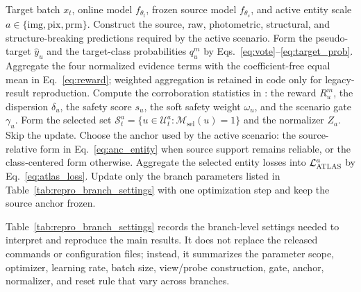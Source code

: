 \begin{algorithm}[t]
\caption{One online \textsc{ATLAS} update on a target batch}
\label{alg:atlas_update}
\small
\begin{algorithmic}[1]
\Require Target batch $x_t$, online model $f_{\theta_t}$, frozen source model $f_{\theta_s}$, and active entity scale $a\in\{\mathrm{img},\mathrm{pix},\mathrm{prm}\}$.
\State Construct the source, raw, photometric, structural, and structure-breaking predictions required by the active scenario.
\State Form the pseudo-target $\hat y_u$ and the target-class probabilities $q_u^m$ by Eqs.~\ref{eq:vote}--\ref{eq:target_prob}.
\State Aggregate the four normalized evidence terms with the coefficient-free equal mean in Eq.~\ref{eq:reward}; weighted aggregation is retained in code only for legacy-result reproduction.
\State Compute the corroboration statistics in \core{}: the reward $R_u^m$, the dispersion $\delta_u$, the safety score $s_u$, the soft safety weight $\omega_u$, and the scenario gate $\gamma_u$.
\State Form the selected set $\mathcal{S}_t^a=\{u\in\mathcal{U}_t^a:\mathcal{M}_{\mathrm{sel}}(u)=1\}$ and the normalizer $Z_a$.
    \State Skip the update.
\EndIf
{}
    \State Choose the \care{} anchor used by the active scenario: the source-relative form in Eq.~\ref{eq:anc_entity} when source support remains reliable, or the class-centered form otherwise.
\EndFor
\State Aggregate the selected entity losses into $\mathcal{L}_{\text{\textsc{ATLAS}}}^{a}$ by Eq.~\ref{eq:atlas_loss}.
\State Update only the branch parameters listed in Table~\ref{tab:repro_branch_settings} with one optimization step and keep the source anchor frozen.
\end{algorithmic}
\end{algorithm}

Table~\ref{tab:repro_branch_settings} records the branch-level settings needed
to interpret and reproduce the main results. It does not replace the released
commands or configuration files; instead, it summarizes the parameter scope,
optimizer, learning rate, batch size, view/probe construction, gate, anchor,
normalizer, and reset rule that vary across branches.

